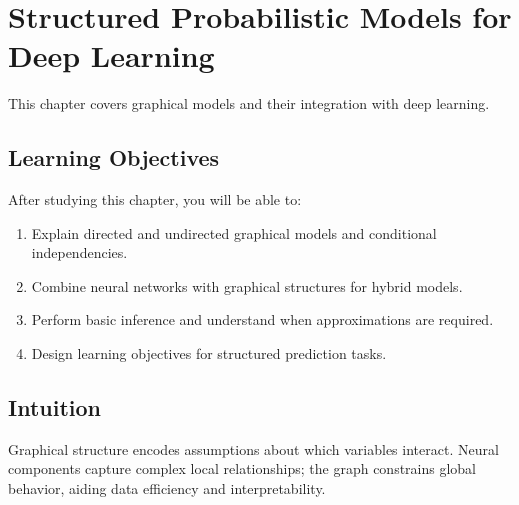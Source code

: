 
\chapter{Structured Probabilistic Models for Deep Learning}
\label{chap:structured-probabilistic-models}

This chapter covers graphical models and their integration with deep learning.


\section*{Learning Objectives}

After studying this chapter, you will be able to:

\begin{enumerate}
    \item Explain directed and undirected graphical models and conditional independencies.
    \item Combine neural networks with graphical structures for hybrid models.
    \item Perform basic inference and understand when approximations are required.
    \item Design learning objectives for structured prediction tasks.
\end{enumerate}


\section*{Intuition}

Graphical structure encodes assumptions about which variables interact. Neural components capture complex local relationships; the graph constrains global behavior, aiding data efficiency and interpretability.










